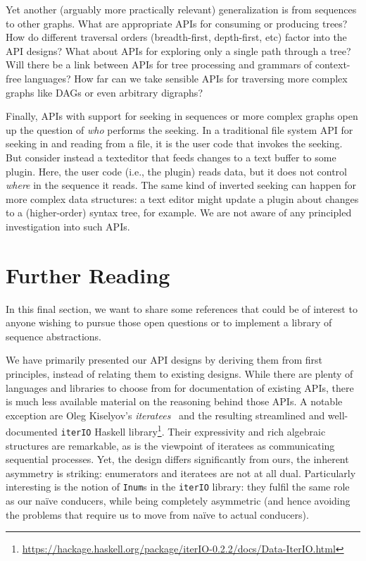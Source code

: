 \documentclass[sigplan,screen,10pt,review]{acmart}
\begin{document}
Yet another (arguably more practically relevant) generalization is from sequences to other graphs. What are appropriate APIs for consuming or producing trees? How do different traversal orders (breadth-first, depth-first, etc) factor into the API designs? What about APIs for exploring only a single path through a tree? Will there be a link between APIs for tree processing and grammars of context-free languages? How far can we take sensible APIs for traversing more complex graphs like DAGs or even arbitrary digraphs?

Finally, APIs with support for seeking in sequences or more complex graphs open up the question of \textit{who} performs the seeking. In a traditional file system API for seeking in and reading from a file, it is the user code that invokes the seeking. But consider instead a texteditor that feeds changes to a text buffer to some plugin. Here, the user code (i.e., the plugin) reads data, but it does not control \textit{where} in the sequence it reads. The same kind of inverted seeking can happen for more complex data structures: a text editor might update a plugin about changes to a (higher-order) syntax tree, for example. We are not aware of any principled investigation into such APIs.

\section{Further Reading}

In this final section, we want to share some references that could be of interest to anyone wishing to pursue those open questions or to implement a library of sequence abstractions.

We have primarily presented our API designs by deriving them from first principles, instead of relating them to existing designs. While there are plenty of languages and libraries to choose from for documentation of existing APIs, there is much less available material on the reasoning behind those APIs. A notable exception are Oleg Kiselyov's \textit{iteratees}~\cite{kiselyov2012iteratees} and the resulting streamlined and well-documented \texttt{iterIO} Haskell library\footnote{\url{https://hackage.haskell.org/package/iterIO-0.2.2/docs/Data-IterIO.html}}. Their expressivity and rich algebraic structures are remarkable, as is the viewpoint of iteratees as communicating sequential processes. Yet, the design differs significantly from ours, the inherent asymmetry is striking: enumerators and iteratees are not at all dual. Particularly interesting is the notion of \texttt{Inum}s in the \texttt{iterIO} library: they fulfil the same role as our naïve conducers, while being completely asymmetric (and hence avoiding the problems that require us to move from naïve to actual conducers).
\end{document}
